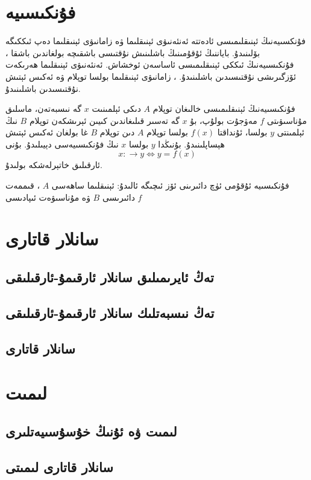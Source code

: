 \section{فۇنكىسىيە}
فۇنكسىيەنىڭ ئېنىقلىمىسى ئادەتتە ئەنئەنىۋى ئېنىقلىما ۋە زامانىۋى ئېنىقلىما دەپ ئىككىگە بۆلىنىدۇ. باياننىڭ ئۇقۇمىنىڭ باشلىنىش نۇقتىسى باشقىچە بولغاندىن باشقا ، فۇنكىسىيەنىڭ ئىككى ئېنىقلىمىسى ئاساسەن ئوخشاش. ئەنئەنىۋى ئېنىقلىما ھەرىكەت ئۆزگىرىشى نۇقتىسىدىن باشلىنىدۇ. ، زامانىۋى ئېنىقلىما بولسا توپلام ۋە ئەكىس ئېتىش نۇقتىسىدىن باشلىنىدۇ.

\begin{MyDefinition}{فۇنكىسىيەنىڭ ئېنىقلىمىسى}{}
 خالىغان توپلام $A$ دىكى ئېلمىنىت $x$ گە نىسبەتەن، ماسلىق مۇناسىۋىتى $f$ مەۋجۇت بولۇپ، بۇ $x$ گە تەسىر قىلىغاندىن كىيىن ئېرىشكەن توپلام $B$ نىڭ ئېلمىنتى $y$ بولسا، ئۇنداقتا $f(x)$ بولسا توپلام $A$ دىن توپلام $B$ غا بولغان ئەكىس ئېتىش ھېساپلىنىدۇ. بۇنىڭدا $y$ بولسا $x$ نىڭ فۇنكىسىيەسى دېيىلىدۇ. بۇنى 
 $$x:\rightarrow y \Leftrightarrow y=f(x)$$
 ئارقىلىق خاتېرلەشكە بولىدۇ.
\end{MyDefinition}
فۇنكىسىيە ئۇقۇمى ئۈچ دائىرىنى ئۆز ئىچىگە ئالىدۇ: ئېنىقلىما ساھەسى $A$ ، قىممەت دائىرىسى $B$ ۋە مۇناسىۋەت ئىپادىسى $f$

\section{سانلار قاتارى}
\subsection{تەڭ ئايرىمىلىق سانلار ئارقىمۇ-ئارقىلىقى}
\subsection{تەڭ نىسبەتلىك سانلار ئارقىمۇ-ئارقىلىقى}
\subsection{سانلار قاتارى}

\section{لىمىت}
\subsection{لىمىت ۋە ئۇنىڭ خۇسۇسىيەتلىرى}
\subsection{سانلار قاتارى لىمىتى}

